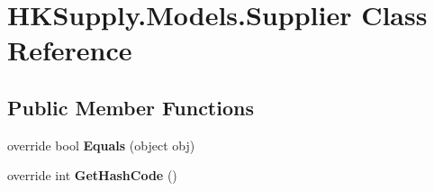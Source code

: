 \hypertarget{class_h_k_supply_1_1_models_1_1_supplier}{}\section{H\+K\+Supply.\+Models.\+Supplier Class Reference}
\label{class_h_k_supply_1_1_models_1_1_supplier}
\subsection*{Public Member Functions}
\begin{DoxyCompactItemize}
\item 
\mbox{\label{class_h_k_supply_1_1_models_1_1_supplier_ab87f03e0a94f090e84b2bfb9224d1a35}} 
override bool {\bfseries Equals} (object obj)
\item 
\mbox{\label{class_h_k_supply_1_1_models_1_1_supplier_a78b73e8b0cdf8d483c685691f4a07e64}} 
override int {\bfseries Get\+Hash\+Code} ()
\end{DoxyCompactItemize}
